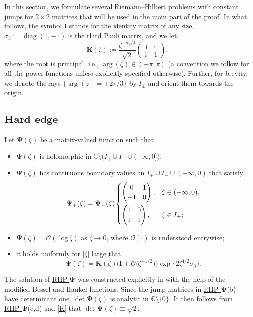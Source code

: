 \documentclass[pdftex]{sigma}
\numberwithin{equation}{section}
\newcommand{\C}		{\mathbb{C}}
\newcommand{\diag}{\operatorname{diag}}
\renewcommand{\arg}{\operatorname{arg}}
\renewcommand{\det}{\operatorname{det}}
\newcommand{\ic}{\mathrm{i}}
\newcommand{\rhpsi} {\textnormal{RHP}-${\boldsymbol \Psi}$}
\begin{document}
In this section, we formulate several Riemann--Hilbert problems with constant jumps for $ 2\times2 $ matrices that will be used in the main part of the proof. In what follows, the symbol $ \boldsymbol I $ stands for the identity matrix of any size, $ \sigma_3 := \diag(1,-1) $ is the third Pauli matrix, and we let
\begin{equation}
\label{K}
\boldsymbol K(\zeta) := \frac{\zeta^{-\sigma_3/4}}{\sqrt2}\left(\begin{matrix} 1 & \ic \\ \ic & 1 \end{matrix}\right),
\end{equation}
where the root is principal, i.e., $\arg(\zeta)\in(-\pi,\pi)$ (a convention we follow for all the power functions unless explicitly specified otherwise). Further, for brevity, we denote the rays $ \{\arg(z)=\pm2\pi/3\} $ by $ I_\pm $ and orient them towards the origin.

 \subsection{Hard edge}

 Let $\boldsymbol\Psi(\zeta)$ be a matrix-valued function such that
\begin{itemize}\itemsep=0pt
\label{rhpsi}
\item[(a)] $\boldsymbol\Psi(\zeta)$ is holomorphic in $\C\setminus\bigl(I_+\cup I_-\cup(-\infty,0]\bigr)$;
\item[(b)] $\boldsymbol\Psi(\zeta)$ has continuous boundary values on $I_+\cup I_-\cup(-\infty,0)$ that satisfy
\[
\boldsymbol\Psi_+(\zeta) = \boldsymbol\Psi_-(\zeta)
\begin{cases}
\left(\begin{matrix} 0 & 1 \\ -1 & 0 \end{matrix}\right), & \zeta\in(-\infty,0), \vspace{1mm}\\
\left(\begin{matrix} 1 & 0 \\ 1 & 1 \end{matrix}\right), & \zeta\in I_\pm;
\end{cases}
\]
\item[(c)] $ \boldsymbol\Psi(\zeta) = \boldsymbol{\mathcal O}(\log\zeta) $ as $\zeta\to0$, where $ \boldsymbol{\mathcal O}(\cdot) $ is understood entrywise;
\item[(d)] it holds uniformly for $ |\zeta| $ large that
\[
\boldsymbol\Psi(\zeta) = \boldsymbol K(\zeta)\bigl(\boldsymbol I + \boldsymbol{\mathcal O} \bigl(\zeta^{-1/2}\bigr)\bigr)\exp\bigl\{2\zeta^{1/2}\sigma_3\bigr\}.
\]
\end{itemize}
The solution of \hyperref[rhpsi]{\rhpsi} was constructed explicitly in \cite[Section~6]{KMcLVAV04} with the help of the modified Bessel and Hankel functions. Since the jump matrices in \hyperref[rhpsi]{\rhpsi}(b) have determinant one, $ \det \boldsymbol\Psi(\zeta) $ is analytic in $ \C\setminus\{0\} $. It then follows from \hyperref[rhpsi]{\rhpsi}(c,d) and \eqref{K} that $ \det \boldsymbol\Psi(\zeta) \equiv \sqrt 2 $.
\end{document}
